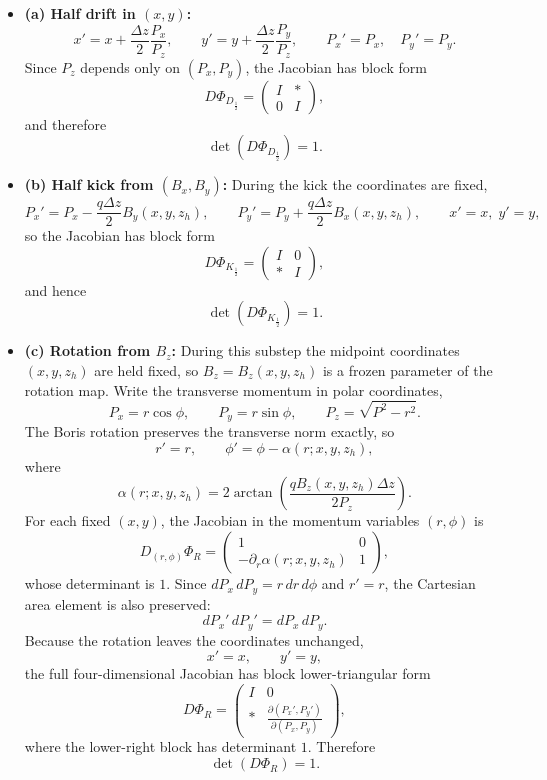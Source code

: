 \begin{itemize}
\item \textbf{(a) Half drift in \((x,y)\):}
\[
x' = x + \frac{\Delta z}{2}\frac{P_x}{P_z}, \qquad
y' = y + \frac{\Delta z}{2}\frac{P_y}{P_z}, \qquad
P_x' = P_x, \quad P_y' = P_y.
\]
Since \(P_z\) depends only on \((P_x,P_y)\), the Jacobian has block form
\[
D\Phi_{D_{\frac12}}=
\begin{pmatrix}
I & *\\
0 & I
\end{pmatrix},
\]
and therefore
\[
\det(D\Phi_{D_{\frac12}}) = 1.
\]

\item \textbf{(b) Half kick from \((B_x,B_y)\):}
During the kick the coordinates are fixed,
\[
P_x' = P_x - \frac{q\Delta z}{2}B_y(x,y,z_h), \qquad
P_y' = P_y + \frac{q\Delta z}{2}B_x(x,y,z_h),
\qquad x'=x,\; y'=y,
\]
so the Jacobian has block form
\[
D\Phi_{K_{\frac12}} =
\begin{pmatrix}
I & 0\\[4pt]
* & I
\end{pmatrix},
\]
and hence
\[
\det(D\Phi_{K_{\frac12}})=1.
\]

\item \textbf{(c) Rotation from \(B_z\):}
During this substep the midpoint coordinates \((x,y,z_h)\) are held fixed, so
\(B_z=B_z(x,y,z_h)\) is a frozen parameter of the rotation map.
Write the transverse momentum in polar coordinates,
\[
P_x = r\cos\phi,\qquad P_y = r\sin\phi,\qquad
P_z = \sqrt{P^2-r^2}.
\]
The Boris rotation preserves the transverse norm exactly, so
\[
r' = r,
\qquad
\phi' = \phi - \alpha(r;x,y,z_h),
\]
where
\[
\alpha(r;x,y,z_h)=2\arctan\!\left(\frac{qB_z(x,y,z_h)\Delta z}{2P_z}\right).
\]
For each fixed \((x,y)\), the Jacobian in the momentum variables
\((r,\phi)\) is
\[
D_{(r,\phi)}\Phi_R =
\begin{pmatrix}
1 & 0\\[2pt]
-\partial_r\alpha(r;x,y,z_h) & 1
\end{pmatrix},
\]
whose determinant is \(1\).
Since \(dP_x\,dP_y = r\,dr\,d\phi\) and \(r'=r\), the Cartesian area element is
also preserved:
\[
dP_x'\,dP_y' = dP_x\,dP_y.
\]
Because the rotation leaves the coordinates unchanged,
\[
x'=x,\qquad y'=y,
\]
the full four-dimensional Jacobian has block lower-triangular form
\[
D\Phi_R=
\begin{pmatrix}
I & 0\\[4pt]
* & \displaystyle\frac{\partial(P_x',P_y')}{\partial(P_x,P_y)}
\end{pmatrix},
\]
where the lower-right block has determinant \(1\).
Therefore
\[
\det(D\Phi_R)=1.
\]
\end{itemize}

